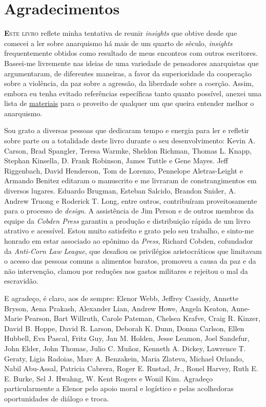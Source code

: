 
\chapter{Agradecimentos}

\lettrine[lines=2]{\textcolor{LettrineColor}{\textbf{E}}}{ste livro} reflete minha tentativa de reunir \emph{insights} que obtive desde que comecei a ler sobre anarquismo há mais de um quarto de século, \emph{insights} frequentemente obtidos como resultado de meus encontros com outros escritores. Baseei-me livremente nas ideias de uma variedade de pensadores anarquistas que argumentaram, de diferentes maneiras, a favor da superioridade da cooperação sobre a violência, da paz sobre a agressão, da liberdade sobre a coerção. Assim, embora eu tenha evitado referências específicas tanto quanto possível, anexei uma lista de \hyperref[chap:rec]{materiais} para o proveito de qualquer um que queira entender melhor o anarquismo.

Sou grato a diversas pessoas que dedicaram tempo e energia para ler e refletir sobre parte ou a totalidade deste livro durante o seu desenvolvimento: Kevin A. Carson, Brad Spangler, Teresa Warmke, Sheldon Richman, Thomas L. Knapp, Stephan Kinsella, D. Frank Robinson, James Tuttle e Gene Mayes. Jeff Riggenbach, David Henderson, Tom de Lorenzo, Pennelope Aletras-Leight e Armando Benitez editaram o manuscrito e me livraram de constrangimentos em diversos lugares. Eduardo Brugman, Esteban Salcido, Brandon Snider, A. Andrew Truong e Roderick T. Long, entre outros, contribuíram proveitosamente para o processo de \emph{design}. A assistência de Jim Person e de outros membros da equipe da \emph{Cobden Press} garantiu a produção e distribuição rápida de um livro atrativo e acessível. Estou muito satisfeito e grato pelo seu trabalho, e sinto-me honrado em estar associado ao epônimo da \emph{Press}, Richard Cobden, cofundador da \emph{Anti-Corn Law League}, que desafiou os privilégios aristocráticos que limitavam o acesso das pessoas comuns a alimentos baratos, promoveu a causa da paz e da não intervenção, clamou por reduções nos gastos militares e rejeitou o mal da escravidão.

E agradeço, é claro, aos de sempre: Elenor Webb, Jeffrey Cassidy, Annette Bryson, Aena Prakash, Alexander Lian, Andrew Howe, Angela Keaton, Anne-Marie Pearson, Bart Willruth, Carole Pateman, Chelsea Krafve, Craig R. Kinzer, David B. Hoppe, David R. Larson, Deborah K. Dunn, Donna Carlson, Ellen Hubbell, Eva Pascal, Fritz Guy, Jan M. Holden, Jesse Leamon, Joel Sandefur, John Elder, John Thomas, Julio C. Muñoz, Kenneth A. Dickey, Lawrence T. Geraty, Ligia Radoias, Marc A. Benzakein, Maria Zlateva, Michael Orlando, Nabil Abu-Assal, Patricia Cabrera, Roger E. Rustad, Jr., Ronel Harvey, Ruth E. E. Burke, Sel J. Hwahng, W. Kent Rogers e Wonil Kim. Agradeço particularmente a Elenor pelo apoio moral e logístico e pelas acolhedoras oportunidades de diálogo e troca.

